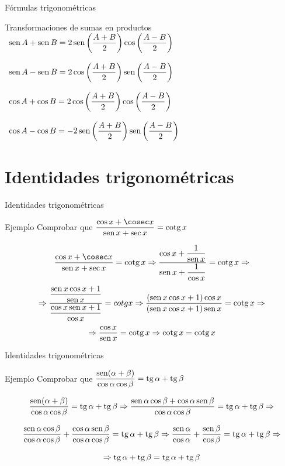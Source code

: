 \documentclass[8pt]{beamer}
\newcommand{\sen}{\mathop{\rm sen}\nolimits}
\newcommand{\tg}{\mathop{\rm tg}\nolimits}
\newcommand{\cotg}{\mathop{\rm cotg}\nolimits}
\begin{document}
\begin{frame}{Fórmulas trigonométricas}
\begin{alertblock}{Transformaciones de sumas en productos}
$\begin{array}{ll}
\sen A + \sen B =2 \sen\left( \dfrac{A+B}{2}\right) \cos\left( \dfrac{A-B}{2}\right)  \\ \\ 
\sen A - \sen B =2 \cos\left( \dfrac{A+B}{2}\right) \sen\left( \dfrac{A-B}{2}\right)  \\ \\ 
\cos A + \cos B =2 \cos\left(  \dfrac{A+B}{2}\right) \cos\left( \dfrac{A-B}{2}\right)  \\ \\
\cos A - \cos B =-2 \sen\left( \dfrac{A+B}{2}\right) \sen\left( \dfrac{A-B}{2}\right)  \\
\end{array}$
\end{alertblock}
\end{frame}
\section{Identidades trigonométricas}
\begin{frame}{Identidades trigonométricas}
\begin{alertblock}{Ejemplo}
Comprobar que $\dfrac{\cos x +\cosec x}{\sen x +\sec x}= \cotg x$
\end{alertblock}

\[\dfrac{\cos x +\cosec x}{\sen x +\sec x}= \cotg x \Rightarrow \dfrac{\cos x + \dfrac{1}{\sen x}}{\sen x +\dfrac{1}{\cos x}}= \cotg x \Rightarrow\]
\[\Rightarrow \dfrac{\dfrac{\sen x \cos x +1}{\sen x}}{\dfrac{\cos x \sen x +1}{\cos x}}= cotg x \Rightarrow \dfrac{(\sen x \cos x +1)\cos x }{(\sen x \cos x +1)\sen x}= \cotg x \Rightarrow\]
\[\Rightarrow \dfrac{\cos x }{\sen x}= \cotg x \Rightarrow \cotg x = \cotg x\]

\end{frame}

\begin{frame}{Identidades trigonométricas}
\begin{alertblock}{Ejemplo}
Comprobar que $\dfrac{\sen (\alpha + \beta)}{\cos \alpha \cos \beta}= \tg \alpha +\tg \beta$
\end{alertblock}

\[\dfrac{\sen (\alpha + \beta)}{\cos \alpha \cos \beta}= \tg \alpha +\tg \beta \Rightarrow \dfrac{\sen \alpha \cos \beta +\cos \alpha \sen \beta}{\cos \alpha \cos \beta}= \tg \alpha +\tg \beta \Rightarrow\]

\[\dfrac{\sen \alpha  \cos \beta}{\cos \alpha \cos \beta}+\dfrac{\cos \alpha  \sen \beta}{\cos \alpha \cos \beta}= \tg \alpha +\tg \beta \Rightarrow \dfrac{\sen \alpha}{\cos \alpha}+\dfrac{\sen \beta}{\cos \beta}= \tg \alpha +\tg \beta \Rightarrow\]

\[ \Rightarrow \tg \alpha +\tg \beta = \tg \alpha +\tg \beta \]
\end{frame}
\end{document}
